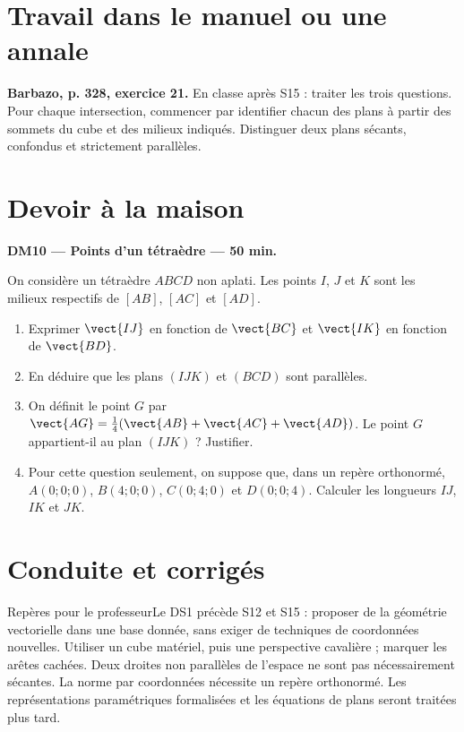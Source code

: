 \section{Travail dans le manuel ou une annale}\textbf{Barbazo, p. 328, exercice 21.} En classe après S15 : traiter les trois questions. Pour chaque intersection, commencer par identifier chacun des plans à partir des sommets du cube et des milieux indiqués. Distinguer deux plans sécants, confondus et strictement parallèles.

\section{Devoir à la maison}\textbf{DM10 --- Points d'un tétraèdre --- 50 min.}\par On considère un tétraèdre $ABCD$ non aplati. Les points $I$, $J$ et $K$ sont les milieux respectifs de $[AB]$, $[AC]$ et $[AD]$.
\begin{enumerate}\item Exprimer $\vect{IJ}$ en fonction de $\vect{BC}$ et $\vect{IK}$ en fonction de $\vect{BD}$.
\item En déduire que les plans $(IJK)$ et $(BCD)$ sont parallèles.
\item On définit le point $G$ par $\vect{AG}=\frac14(\vect{AB}+\vect{AC}+\vect{AD})$. Le point $G$ appartient-il au plan $(IJK)$ ? Justifier.
\item Pour cette question seulement, on suppose que, dans un repère orthonormé, $A(0;0;0)$, $B(4;0;0)$, $C(0;4;0)$ et $D(0;0;4)$. Calculer les longueurs $IJ$, $IK$ et $JK$.\end{enumerate}

\ifprof\clearpage\section{Conduite et corrigés}\begin{profbox}{Repères pour le professeur}Le DS1 précède S12 et S15 : proposer de la géométrie vectorielle dans une base donnée, sans exiger de techniques de coordonnées nouvelles. Utiliser un cube matériel, puis une perspective cavalière ; marquer les arêtes cachées. Deux droites non parallèles de l'espace ne sont pas nécessairement sécantes. La norme par coordonnées nécessite un repère orthonormé. Les représentations paramétriques formalisées et les équations de plans seront traitées plus tard.\end{profbox}

